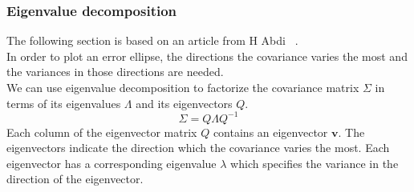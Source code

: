 \documentclass[12pt,oneside,openany,a4paper, %
afrikaans,english,
]{memoir}
\numberwithin{equation}{chapter}
\begin{document}
\subsubsection{Eigenvalue decomposition}
The following section is based on an article from H Abdi ~\cite{abdi}.\\
In order to plot an error ellipse, the directions the covariance varies the most and the variances in those directions are needed.\\
We can use eigenvalue decomposition to factorize the covariance matrix $\Sigma$ in terms of its eigenvalues $\Lambda$ and its eigenvectors $Q$.
\begin{equation}
\Sigma = Q\Lambda Q^{-1}
\end{equation}
Each column of the eigenvector matrix $Q$ contains an eigenvector $\bm{v}$. The eigenvectors indicate the direction which the covariance varies the most. Each eigenvector has a corresponding eigenvalue $\lambda$ which specifies the variance in the direction of the eigenvector. 
\end{document}
